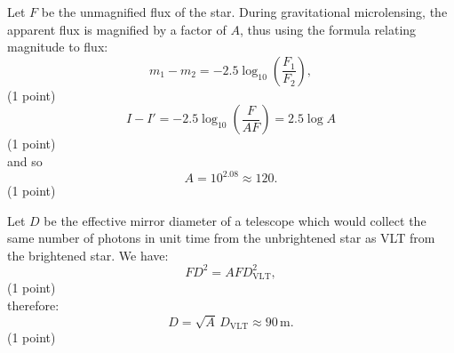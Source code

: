 Let $F$ be the unmagnified flux of the star. During gravitational
microlensing, the apparent flux is magnified by a factor of $A$, thus using
the formula relating magnitude to flux:
\[ m_1 - m_2 = -2.5\log_{10}\left(\frac{F_1}{F_2}\right), \]
\hfill(1 point)
\[ I - I' = -2.5\log_{10}\left(\frac{F}{AF}\right) = 2.5\log A \]
\hfill(1 point)\\
and so
\[ A = 10^{2.08} \approx 120. \]
\hfill(1 point)

Let $D$ be the effective mirror diameter of a telescope which would collect
the same number of photons in unit time from the unbrightened star as VLT
from the brightened star. We have:
\[ FD^2 = AFD_{\mathrm{VLT}}^2, \]
\hfill(1 point)\\
therefore:
\[ D = \sqrt{A}\,D_{\mathrm{VLT}} \approx 90\,\mathrm{m}. \]
\hfill(1 point)
